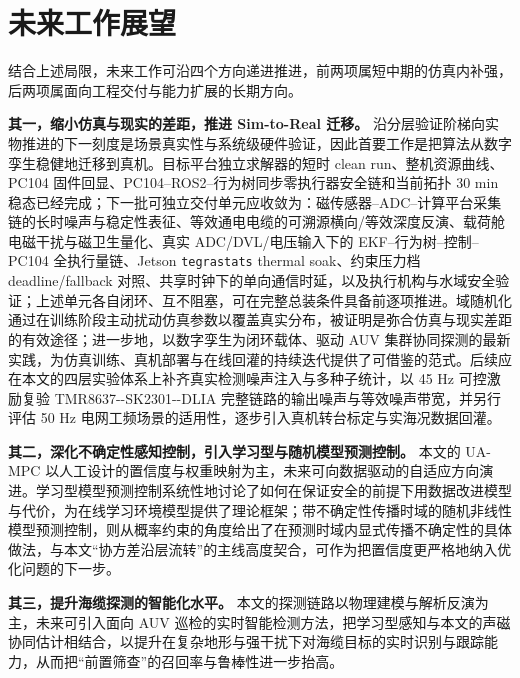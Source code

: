 \section{未来工作展望}\label{sec:ch06-6-3}

结合上述局限，未来工作可沿四个方向递进推进，前两项属短中期的仿真内补强，后两项属面向工程交付与能力扩展的长期方向。

\textbf{其一，缩小仿真与现实的差距，推进 Sim-to-Real 迁移。} 沿分层验证阶梯向实物推进的下一刻度是场景真实性与系统级硬件验证，因此首要工作是把算法从数字孪生稳健地迁移到真机。目标平台独立求解器的短时 clean run、整机资源曲线、PC104 固件回显、PC104--ROS2--行为树同步零执行器安全链和当前拓扑 30 min 稳态已经完成；下一批可独立交付单元应收敛为：磁传感器--ADC--计算平台采集链的长时噪声与稳定性表征、等效通电电缆的可溯源横向/等效深度反演、载荷舱电磁干扰与磁卫生量化、真实 ADC/DVL/电压输入下的 EKF--行为树--控制--PC104 全执行量链、Jetson \texttt{tegrastats} thermal soak、约束压力档 deadline/fallback 对照、共享时钟下的单向通信时延，以及执行机构与水域安全验证；上述单元各自闭环、互不阻塞，可在完整总装条件具备前逐项推进。域随机化通过在训练阶段主动扰动仿真参数以覆盖真实分布，被证明是弥合仿真与现实差距的有效途径\cite{tobin2017domain}；进一步地，以数字孪生为闭环载体、驱动 AUV 集群协同探测的最新实践，为仿真训练、真机部署与在线回灌的持续迭代提供了可借鉴的范式\cite{yan2026digitaltwin}。后续应在本文的四层实验体系上补齐真实检测噪声注入与多种子统计，以 45 Hz 可控激励复验 TMR8637-\/-SK2301-\/-DLIA 完整链路的输出噪声与等效噪声带宽，并另行评估 50 Hz 电网工频场景的适用性，逐步引入真机转台标定与实海况数据回灌。

\textbf{其二，深化不确定性感知控制，引入学习型与随机模型预测控制。} 本文的 UA-MPC 以人工设计的置信度与权重映射为主，未来可向数据驱动的自适应方向演进。学习型模型预测控制系统性地讨论了如何在保证安全的前提下用数据改进模型与代价，为在线学习环境模型提供了理论框架\cite{hewing2020learning}；带不确定性传播时域的随机非线性模型预测控制，则从概率约束的角度给出了在预测时域内显式传播不确定性的具体做法，与本文``协方差沿层流转''的主线高度契合，可作为把置信度更严格地纳入优化问题的下一步\cite{zarrouki2024stochastic}。

\textbf{其三，提升海缆探测的智能化水平。} 本文的探测链路以物理建模与解析反演为主，未来可引入面向 AUV 巡检的实时智能检测方法，把学习型感知与本文的声磁协同估计相结合，以提升在复杂地形与强干扰下对海缆目标的实时识别与跟踪能力\cite{bodenmann2024realtime}，从而把``前置筛查''的召回率与鲁棒性进一步抬高。

